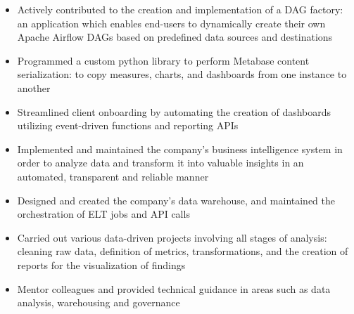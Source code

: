 \documentclass[10pt,a4paper,ragged2e,withhyper]{altacv}
\begin{document}
\begin{paracol}{2}

%



\begin{itemize}

\item Actively contributed to the creation and implementation of a DAG factory: an application which enables end-users to dynamically create their own Apache Airflow DAGs based on predefined data sources and destinations

\item Programmed a custom python library to perform Metabase content serialization: to copy measures, charts, and dashboards from one instance to another

\item Streamlined client onboarding by automating the creation of dashboards utilizing event-driven functions and reporting APIs

\end{itemize}

\divider

\begin{itemize}

\item Implemented and maintained the company’s business intelligence system in order to analyze data and transform it into valuable insights in an automated, transparent and reliable manner

\item Designed and created the company's data warehouse, and maintained the orchestration of ELT jobs and API calls

\item Carried out various data-driven projects involving all stages of analysis: cleaning raw data, definition of metrics, transformations, and the creation of reports for the visualization of findings

\item Mentor colleagues and provided technical guidance in areas such as data analysis, warehousing and governance


\end{itemize}
\end{paracol}
\end{document}
